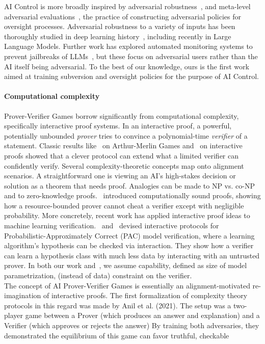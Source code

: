 AI Control is more broadly inspired by adversarial robustness~\citep{goodfellow2019research}, and meta-level adversarial evaluations~\citep{shlegeris2023meta}, the practice of constructing adversarial policies for oversight processes. Adversarial robustness to a variety of inputs has been thoroughly studied in deep learning history~\citep{szegedy2013intriguing, biggio2013evasion, goodfellow2014explaining}, including recently in Large Language Models. Further work has explored automated monitoring systems to prevent jailbreaks of LLMs~\citep{zhang2023defending}, but these focus on adversarial users rather than the AI itself being adversarial. To the best of our knowledge, ours is the first work aimed at training subversion and oversight policies for the purpose of AI Control.

\paragraph{Computational complexity} Prover-Verifier Games borrow significantly from computational complexity, specifically interactive proof systems. In an interactive proof, a powerful, potentially unbounded \emph{prover} tries to convince a polynomial-time \emph{verifier} of a statement. Classic results like~\citet{babai1985trading} on Arthur-Merlin Games and~\citet{goldwasser1985ip} on interactive proofs showed that a clever protocol can extend what a limited verifier can confidently verify. Several complexity-theoretic concepts map onto alignment scenarios. A straightforward one is viewing an AI’s high-stakes decision or solution as a theorem that needs proof. Analogies can be made to NP vs. co-NP and to zero-knowledge proofs.~\citet{micali2000computationally} introduced computationally sound proofs, showing how a resource-bounded prover cannot cheat a verifier except with negligible probability. More concretely, recent work has applied interactive proof ideas to machine learning verification.~\citet{goldwasser2021interactive} and~\citet{pmlr-v195-mutreja23a} devised interactive protocols for Probabilistic-Approximately Correct (PAC) model verification, where a learning algorithm’s hypothesis can be checked via interaction. They show how a verifier can learn a hypothesis class with much less data by interacting with an untrusted prover. In both our work and~\citet{kirchner2024prover}, we assume capability, defined as size of model parametrization, (instead of data) constraint on the verifier. 
\\
The concept of AI Prover-Verifier Games is essentially an alignment-motivated re-imagination of interactive proofs. The first formalization of complexity theory protocols in this regard was made by Anil et al. (2021). The setup was a two-player game between a Prover (which produces an answer and explanation) and a Verifier (which approves or rejects the answer) By training both adversaries, they demonstrated the equilibrium of this game can favor truthful, checkable
